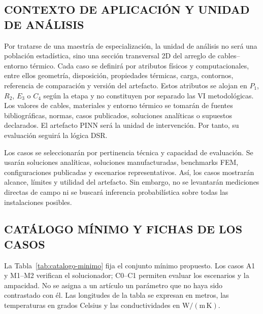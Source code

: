 \subsection{CONTEXTO DE APLICACIÓN Y UNIDAD DE ANÁLISIS}
\label{subsec:unidad-analisis}

Por tratarse de una maestría de especialización, la unidad de análisis no será una población estadística, sino una sección transversal 2D del arreglo de cables--entorno térmico. Cada caso se definirá por atributos físicos y computacionales, entre ellos geometría, disposición, propiedades térmicas, carga, contornos, referencia de comparación y versión del artefacto. Estos atributos se alojan en $P_1$, $R_2$, $E_3$ o $C_4$ según la etapa y no constituyen por separado las VI metodológicas. Los valores de cables, materiales y entorno térmico se tomarán de fuentes bibliográficas, normas, casos publicados, soluciones analíticas o supuestos declarados. El artefacto PINN será la unidad de intervención. Por tanto, su evaluación seguirá la lógica DSR.

Los casos se seleccionarán por pertinencia técnica y capacidad de evaluación. Se usarán soluciones analíticas, soluciones manufacturadas, benchmarks FEM, configuraciones publicadas y escenarios representativos. Así, los casos mostrarán alcance, límites y utilidad del artefacto. Sin embargo, no se levantarán mediciones directas de campo ni se buscará inferencia probabilística sobre todas las instalaciones posibles.

\subsection{CATÁLOGO MÍNIMO Y FICHAS DE LOS CASOS}
\label{subsec:fichas-casos}

La Tabla~\ref{tab:catalogo-minimo} fija el conjunto mínimo propuesto. Los casos A1 y M1--M2 verifican el solucionador; C0--C1 permiten evaluar los escenarios y la ampacidad. No se asigna a un artículo un parámetro que no haya sido contrastado con él. Las longitudes de la tabla se expresan en metros, las temperaturas en grados Celsius y las conductividades en $\mathrm{W/(m\,K)}$.

